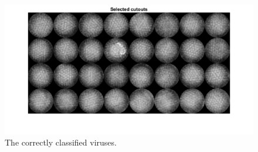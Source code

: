 \documentclass[12pt]{article}
\begin{document}
\begin{figure}[h!]
  \centering
  \includegraphics[width = 15cm]{images/Q7_cutouts.png}
  \caption{The correctly classified viruses.}
  \label{fig:Q7_cutout}
\end{figure}
\end{document}
